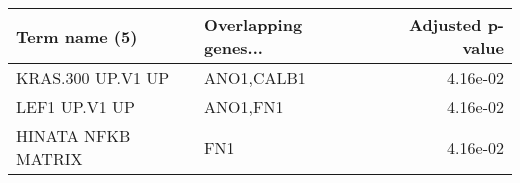 \begin{tabular}{llr}
\toprule
     Term name (5) & Overlapping genes... &  Adjusted p-value \\
\midrule
 KRAS.300 UP.V1 UP &           ANO1,CALB1 &          4.16e-02 \\
     LEF1 UP.V1 UP &             ANO1,FN1 &          4.16e-02 \\
HINATA NFKB MATRIX &                  FN1 &          4.16e-02 \\
\bottomrule
\end{tabular}
